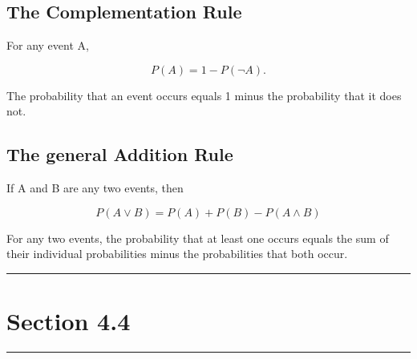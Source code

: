 \documentclass[12pt]{article}
\begin{document}
        \subsection*{The Complementation Rule}
            For any event A,
            \begin{center}
                \[
                    P(A) = 1 - P(\neg A).                
                \]
            \end{center}
            The probability that an event occurs equals 1 minus the probability that it does not.
        \subsection*{The general Addition Rule}
            If A and B are any two events, then
            \begin{center}
                \[
                    P(A \vee B) = P(A) + P(B) - P(A \wedge B) 
                \]
            \end{center}
            For any two events, the probability that at least one occurs equals the sum of their
            individual probabilities minus the probabilities that both occur.

    \noindent\rule{\textwidth}{0.4pt}
    \section*{Section 4.4}
    \noindent\rule{\textwidth}{0.4pt}
\end{document}
